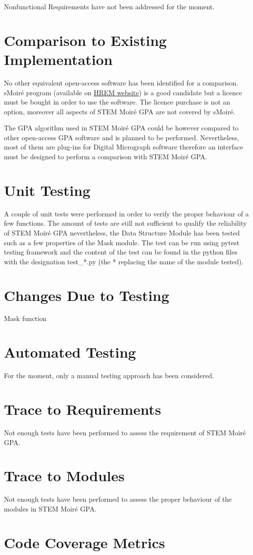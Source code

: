 \documentclass[12pt, titlepage]{article}
\newcommand{\progname}{STEM Moir{\'e} GPA}
\begin{document}
Nonfunctional Requirements have not been addressed for the moment.
	
\section{Comparison to Existing Implementation}	

No other equivalent open-access software has been identified for a comparison. sMoir{\'e} program (available on \href{https://www.hremresearch.com/}{HREM website}) is a good candidate but a licence must be bought in order to use the software. The licence purchase is not an option, moreover all aspects of \progname{} are not covered by sMoir{\'e}.

The GPA algorithm used in \progname{} could be however compared to other open-access GPA software and is planned to be performed. Nevertheless, most of them are plug-ins for Digital Micrograph software therefore an interface must be designed to perform a comparison with \progname{}. 

\section{Unit Testing}

A couple of unit tests were performed in order to verify the proper behaviour of a few functions. The amount of tests are still not sufficient to qualify the reliability of \progname{} nevertheless, the Data Structure Module has been tested such as a few properties of the Mask module. The test can be run using pytest testing framework and the content of the test can be found in the python files with the designation test{\_}*.py (the * replacing the name of the module tested).

\section{Changes Due to Testing}

Mask function 

\section{Automated Testing}

For the moment, only a manual testing approach has been considered.

\section{Trace to Requirements}

Not enough tests have been performed to assess the requirement of \progname{}.
		
\section{Trace to Modules}

Not enough tests have been performed to assess the proper behaviour of the modules in \progname{}.		

\section{Code Coverage Metrics}






\end{document}
